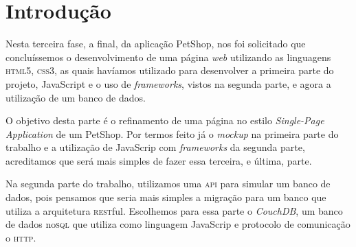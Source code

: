 \chapter*[Introdução]{Introdução}
Nesta terceira fase, a  final, da aplicação PetShop, nos foi solicitado que
concluíssemos o desenvolvimento de uma página \emph{web} utilizando as
linguagens \textsc{html5}, \textsc{css3}, as quais havíamos utilizado para
desenvolver a primeira parte do projeto, JavaScript e o uso de \emph{frameworks}, vistos na segunda parte, e agora a utilização de um banco de dados.

O objetivo desta parte é o refinamento de uma página no estilo
\emph{Single-Page Application} de um PetShop. Por termos feito já o
\emph{mockup} na primeira parte do trabalho e a utilização de JavaScrip com \emph{frameworks} da segunda parte, acreditamos que será mais simples de fazer essa terceira, e última, parte.

Na segunda parte do trabalho, utilizamos uma \textsc{api} para simular um banco de dados, pois pensamos que seria mais simples a migração para um banco que utiliza a arquitetura \textsc{rest}ful. Escolhemos para essa parte o \emph{CouchDB}, um banco de dados no\textsc{sql} que utiliza como linguagem JavaScrip e protocolo de comunicação o \textsc{http}.
